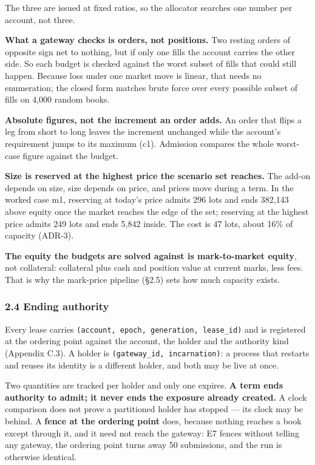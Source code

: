 \documentclass[10pt,a4paper]{article}
\begin{document}
The three are issued at fixed ratios, so the allocator searches one number per
account, not three.

\textbf{What a gateway checks is orders, not positions.} Two resting orders of
opposite sign net to nothing, but if only one fills the account carries the
other side. So each budget is checked against the worst subset of fills that
could still happen. Because loss under one market move is linear, that needs no
enumeration; the closed form matches brute force over every possible subset of fills on
4,000 random books.

\textbf{Absolute figures, not the increment an order adds.} An order that flips a leg
from short to long leaves the increment unchanged while the account's
requirement jumps to its maximum (c1). Admission compares the whole worst-case
figure against the budget.

\textbf{Size is reserved at the highest price the scenario set reaches.} The add-on
depends on size, size depends on price, and prices move during a term. In the
worked case m1, reserving at today's price admits 296 lots and ends 382,143 above
equity once the market reaches the edge of the set; reserving at the highest
price admits 249 lots and ends 5,842 inside. The cost is 47 lots, about 16\% of
capacity (ADR-3).

\textbf{The equity the budgets are solved against is mark-to-market equity}, not
collateral: collateral plus cash and position value at current marks, less fees.
That is why the mark-price pipeline (§2.5) sets how much capacity exists.

\subsubsection{2.4 Ending authority}\label{ending-authority}

Every lease carries \texttt{(account,\ epoch,\ generation,\ lease\_id)} and is registered at
the ordering point against the account, the holder and the authority kind
(Appendix C.3). A holder is \texttt{(gateway\_id,\ incarnation)}: a process that restarts
and reuses its identity is a different holder, and both may be live at once.

Two quantities are tracked per holder and only one expires. \textbf{A term ends
authority to admit; it never ends the exposure already created.} A clock
comparison does not prove a partitioned holder has stopped --- its clock may be
behind. A \textbf{fence at the ordering point} does, because nothing reaches a book
except through it, and it need not reach the gateway: E7 fences without telling
any gateway, the ordering point turns away 50 submissions, and the run is
otherwise identical.
\end{document}
